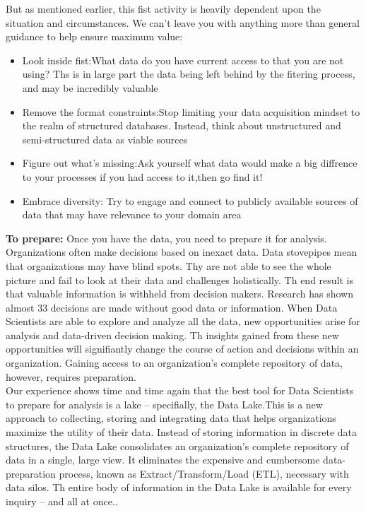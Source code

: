 \documentclass[a4paper,12pt,oneside]{report}
\begin{document}
{\begin{enumerate}
{But as mentioned earlier, this fist activity is heavily dependent upon the situation and circumstances. We can’t leave you with anything more than general guidance to help ensure maximum value:
\begin{itemize}
\item{Look inside fist:}{What data do you have current access to that you are not using? Ths is in large part the data being left behind by the fitering process, and may be incredibly valuable}
\item{Remove the format constraints:}{Stop limiting your data acquisition mindset to the realm of structured databases. Instead, think about unstructured and semi-structured data as viable sources}
\item{Figure out what’s missing:}{Ask yourself what data would make a big diffrence to your processes if you had access to it,then go find it!}
\item{Embrace diversity: }{Try to engage and connect to publicly available sources of data that may have relevance to your domain area}
\end{itemize}
\item \textbf {To prepare:} Once you have the data, you need to prepare it for analysis. Organizations often make decisions based on inexact data. Data stovepipes mean that organizations may have blind spots. Thy are not able to see the whole picture and fail to look at their data and challenges holistically. Th end result is that valuable information is withheld from decision makers. Research has shown almost 33%
decisions are made without good data or information.  When Data Scientists are able to explore and analyze all the data, new opportunities arise for analysis and data-driven decision making. Th
insights gained from these new opportunities will signifiantly change the course of action and decisions within an organization. Gaining
access to an organization’s complete repository of data, however, requires preparation.\\
Our experience shows time and time again that the best tool for Data Scientists to prepare for analysis is a lake – specifially, the Data Lake.This is a new approach to collecting, storing and integrating
data that helps organizations maximize the utility of their data. Instead of storing information in discrete data structures, the Data Lake consolidates an organization’s complete repository of data in a single, large view. It eliminates the expensive and cumbersome
data-preparation process, known as Extract/Transform/Load (ETL), necessary with data silos. Th entire body of information in the Data Lake is available for every inquiry – and all at once..}

\end{enumerate}}
\end{document}
